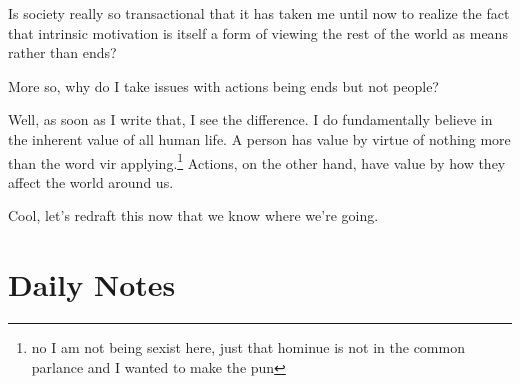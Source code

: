 \documentclass[12pt]{article}
\renewcommand{\,}{\textsuperscript{,}}
\begin{document}
Is society really so transactional that it has taken me until now to realize the fact that intrinsic motivation is itself a form of viewing the rest of the world as means rather than ends?

More so, why do I take issues with actions being ends but not people?

Well, as soon as I write that, I see the difference.  
I do fundamentally believe in the inherent value of all human life.  
A person has value by virtue of nothing more than the word vir applying.\footnote{no I am not being sexist here, just that hominue is not in the common parlance and I wanted to make the pun}  
Actions, on the other hand, have value by how they affect the world around us.

Cool, let's redraft this now that we know where we're going.

\section{Daily Notes}
\end{document}

